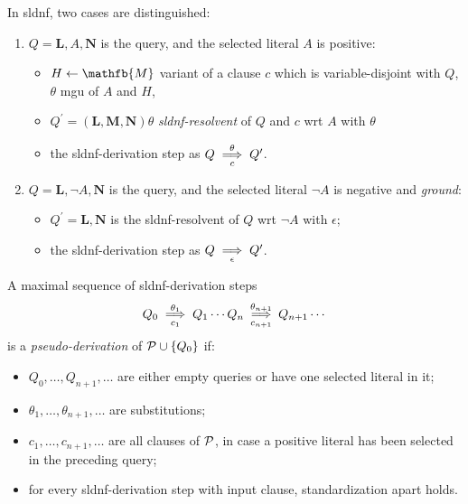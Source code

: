 \begin{dfn}
    In \gls{sldnf}, two cases are distinguished:
    \begin{enumerate}
        \item \(Q = \mathbf{L}, A, \mathbf{N}\) is the query, and the selected literal \(A\) is positive:
        \begin{itemize}
            \item \(H \from \mathfb{M}\) variant of a clause \(c\) which is variable-disjoint with \(Q\), \(\theta\) \gls{mgu} of \(A\) and \(H\),
            \item \(Q^\prime = (\mathbf{L},\mathbf{M},\mathbf{N})\theta\) \emph{\gls{sldnf}-resolvent} of \(Q\) and \(c\) wrt \(A\) with \(\theta\)
            \item the \gls{sldnf}-derivation step as \(Q \underset{c}{\overset{\theta}{\implies}} Q^\prime\).
        \end{itemize}
        \item \(Q = \mathbf{L}, \neg A, \mathbf{N}\) is the query, and the selected literal \(\neg A\) is negative and \emph{ground}:
        \begin{itemize}
            \item \(Q^\prime = \mathbf{L},\mathbf{N}\) is the \gls{sldnf}-resolvent of \(Q\) wrt \(\neg A\) with \(\epsilon\);
            \item the \gls{sldnf}-derivation step as \(Q \underset{\epsilon}{\overset{}{\implies}} Q^\prime\).
        \end{itemize}
    \end{enumerate}
\end{dfn}

\begin{dfn}
    A maximal sequence of \gls{sldnf}-derivation steps
    \begin{equation*}
        Q_0 \underset{c_1}{\overset{\theta_1}{\implies}} Q_1 \dotsb Q_n
        \underset{c_{n+1}}{\overset{\theta_{n+1}}{\implies}} Q_{n+1} \dotsb
    \end{equation*}
    is a \emph{pseudo-derivation} of \(\mathcal{P} \cup \lbrace Q_0 \rbrace\) if:
    \begin{itemize}
        \item \(Q_0,\dotsc,Q_{n+1},\dotsc\) are either empty queries or have one selected literal in it;
        \item \(\theta_1,\dotsc,\theta_{n+1},\dotsc\) are substitutions;
        \item \(c_1,\dotsc,c_{n+1},\dotsc\) are all clauses of \(\mathcal{P}\), in case a positive literal has been selected in the preceding query;
        \item for every \gls{sldnf}-derivation step with input clause, standardization apart holds.
    \end{itemize}
\end{dfn}

